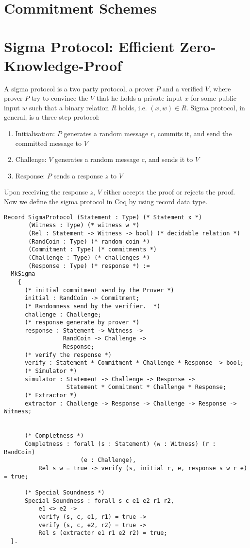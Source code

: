 \section{Commitment Schemes}



\section{Sigma Protocol: Efficient Zero-Knowledge-Proof}
A sigma protocol is a two party protocol, a prover $P$ and a verified $V$, where prover $P$ try to convince the $V$ that he 
holds a private input $x$ for some public input $w$ such that a binary relation $R$ holds, i.e. $(x, w) \in R$.  Sigma protocol, 
in general, is a three step protocol:
\begin{enumerate}
\item Initialisation: $P$ generates a random message $r$, commits it, and send the committed message to $V$
\item Challenge: $V$ generates a random message $c$, and sends it to $V$
\item Response: $P$ sends a response $z$ to $V$
\end{enumerate} 

\noindent
Upon receiving the response $z$, $V$ either accepts the proof or rejects the proof.  Now we define the sigma protocol in 
Coq by using record data type.

\begin{verbatim}
Record SigmaProtocol (Statement : Type) (* Statement x *)
       (Witness : Type) (* witness w *)
       (Rel : Statement -> Witness -> bool) (* decidable relation *)
       (RandCoin : Type) (* random coin *) 
       (Commitment : Type) (* commitments *)
       (Challenge : Type) (* challenges *) 
       (Response : Type) (* response *) :=
  MkSigma 
    {
      (* initial commitment send by the Prover *)
      initial : RandCoin -> Commitment;
      (* Randomness send by the verifier.  *) 
      challenge : Challenge;
      (* response generate by prover *)
      response : Statement -> Witness ->
                 RandCoin -> Challenge ->
                 Response;
      (* verify the response *)
      verify : Statement * Commitment * Challenge * Response -> bool;
      (* Simulator *)
      simulator : Statement -> Challenge -> Response ->
                  Statement * Commitment * Challenge * Response;
      (* Extractor *)
      extractor : Challenge -> Response -> Challenge -> Response -> Witness;
  

      (* Completness *)
      Completness : forall (s : Statement) (w : Witness) (r : RandCoin)
                      (e : Challenge),
          Rel s w = true -> verify (s, initial r, e, response s w r e) = true;

      (* Special Soundness *)
      Special_Soundness : forall s c e1 e2 r1 r2,
          e1 <> e2 ->
          verify (s, c, e1, r1) = true ->
          verify (s, c, e2, r2) = true ->
          Rel s (extractor e1 r1 e2 r2) = true;
  }.
\end{verbatim}


